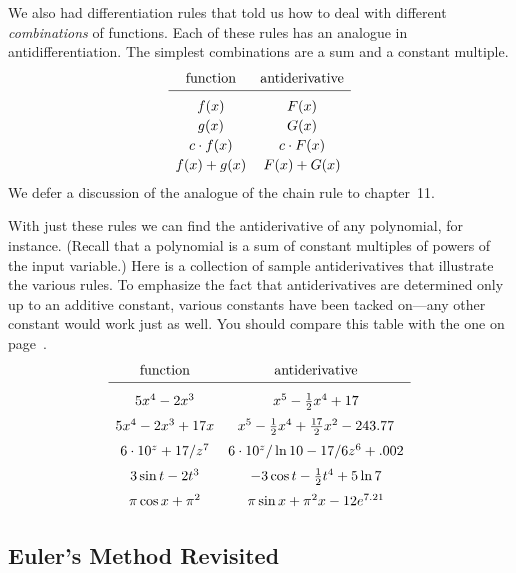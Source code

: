 \pagebreak

We also had differentiation rules that told us how to deal with
different {\em combinations\/} of functions.  Each of these rules has
an analogue in antidifferentiation.  The simplest combinations are a
sum and a constant multiple.
        \addtolength{\arraycolsep}{15pt}
        \[
\begin{array}{cc}
        \mbox{function} & \mbox{antiderivative} \\[2pt] \hline
        \rule{0pt}{14pt} f(x) \rule{0pt}{14pt} & F(x) \\[2pt]
        g(x) & G(x) \\[2pt]
        c \cdot f(x) & c \cdot F(x) \\[2pt]
        f(x) + g(x) & F(x) + G(x) 
        \end{array}
\]
        \addtolength{\arraycolsep}{-15pt}
We defer a discussion of the analogue of the chain rule to chapter~11.

With just these rules we can find the antiderivative of any
polynomial, for instance.  (Recall that a polynomial is a sum of
constant multiples of powers of the input variable.)  Here is a
collection of sample antiderivatives that illustrate the various
rules.  To emphasize the fact that antiderivatives are determined only
up to an additive constant, various constants have been tacked
on---any other constant would work just as well.  You should compare
this table with the one on page~\pageref{deriv table}.\label{antideriv
  table} \addtolength{\arraycolsep}{8pt}
        \[
\begin{array}{cc}
        \mbox{function} & \mbox{antiderivative} \\[2pt] \hline
        \rule{0pt}{16pt} 5x^4 - 2x^3\rule{0pt}{16pt} & 
                x^5 - \frac{1}{2}x^4 +17 \\[6pt]
        5x^4 - 2x^3 + 17x & 
                x^5 - \frac{1}{2}x^4 + \frac{17}{2}x^2 -243.77 \\[6pt]
        6 \cdot 10^z + 17/z^7 & 
                 6 \cdot 10^z/\ln{10} -  17/6z^6 +.002 \\[6pt]
        3\sin{t} - 2t^3 & -3\cos{t} - \frac{1}{2}t^4 +5\ln{7} \\[6pt]
        \pi\cos{x} + \pi^2 & \pi\sin{x} + \pi^2 x  - 12e^{7.21}
        \end{array}
\]
        \addtolength{\arraycolsep}{-8pt}


\subsection{Euler's Method Revisited}
\label{subsec:eulers-method-revisited}

